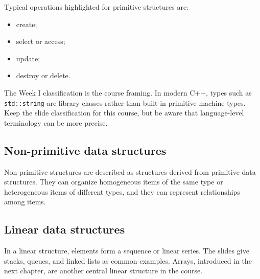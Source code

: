 Typical operations highlighted for primitive structures are:

\begin{itemize}
  \item create;
  \item select or access;
  \item update;
  \item destroy or delete.
\end{itemize}

\begin{clarification}
The Week I classification is the course framing. In modern C++, types such as \texttt{std::string} are library classes rather than built-in primitive machine types. Keep the slide classification for this course, but be aware that language-level terminology can be more precise.
\end{clarification}

\subsection{Non-primitive data structures}

Non-primitive structures are described as structures derived from primitive data structures. They can organize homogeneous items of the same type or heterogeneous items of different types, and they can represent relationships among items.

\subsection{Linear data structures}

In a linear structure, elements form a sequence or linear series. The slides give stacks, queues, and linked lists as common examples. Arrays, introduced in the next chapter, are another central linear structure in the course.

\begin{mlfigure}
\end{mlfigure}

